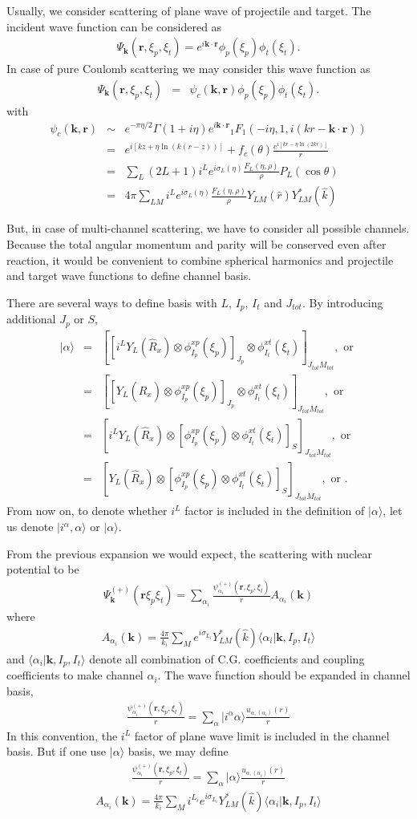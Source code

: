 \documentclass[11pt]{book}
\def\bm{\boldsymbol}
\def\vk{{\bm k}}
\def\vr{{\bm r}}
\def\la{\langle}
\def\ra{\rangle}
\newcommand{\bea}{\begin{eqnarray}}
\newcommand{\eea}{\end{eqnarray}}
\newcommand{\no}{\nonumber \\}
\begin{document}
Usually, we consider scattering of plane wave of projectile and target. 
The incident wave function can be considered as
\bea 
\Psi_\vk(\vr, \xi_p,\xi_t) = e^{i\vk\cdot\vr}\phi_p(\xi_p)\phi_t(\xi_t).
\eea 
In case of pure Coulomb scattering we may consider this wave function as
\bea 
\Psi_\vk(\vr, \xi_p,\xi_t) &=& \psi_c(\vk,\vr) \phi_p(\xi_p)\phi_t(\xi_t).
\eea 
with 
\bea 
\psi_c(\vk,\vr)&\sim& e^{-\pi\eta/2}\Gamma(1+i\eta)e^{i\vk\cdot\vr}{}_1F_1(-i\eta,1,i(kr-\vk\cdot\vr))\no 
               &=& e^{i[kz+\eta\ln(k(r-z))]} +f_c(\theta)\frac{e^{i[kr-\eta\ln(2k r)]} }{r} \no 
               &=& \sum_{L} (2L+1) i^L e^{i\sigma_L(\eta)}\frac{F_L(\eta,\rho)}{\rho} P_L(\cos\theta) \no 
               &=& 4\pi \sum_{LM}  i^L e^{i\sigma_L(\eta)}\frac{F_L(\eta,\rho)}{\rho} Y_{LM}(\hat{r})Y_{LM}^*(\hat{k})
\eea 

But, in case of multi-channel scattering, we have to consider all possible channels. 
Because the total angular momentum and parity will be conserved even after reaction, 
it would be convenient to combine spherical harmonics and projectile and target wave functions 
to define channel basis. 

There are several ways to define basis with $L$, $I_p$, $I_t$ and $J_{tot}$. 
By introducing additional $J_p$ or $S$,
\bea 
|\alpha\ra &=& \left[ \left[i^{L} Y_{L}(\hat{R}_x)\otimes \phi^{xp}_{I_p}(\xi_p)\right]_{J_p} 
\otimes \phi^{xt}_{I_t}(\xi_t)\right]_{J_{tot}M_{tot}}, \mbox{ or }\no 
  &=& \left[ \left[ Y_{L}(\hat{R}_x)\otimes \phi^{xp}_{I_p}(\xi_p)\right]_{J_p} 
\otimes \phi^{xt}_{I_t}(\xi_t)\right]_{J_{tot}M_{tot}}, \mbox{ or }\no 
  &=& \left[ i^{L} Y_{L}(\hat{R}_x)\otimes 
                           \left[\phi^{xp}_{I_p}(\xi_p)\otimes \phi^{xt}_{I_t}(\xi_t)\right]_{S}\right]_{J_{tot}M_{tot}}, 
                           \mbox{ or } \no 
 &=& \left[ Y_{L}(\hat{R}_x)\otimes  \left[\phi^{xp}_{I_p}(\xi_p)\otimes \phi^{xt}_{I_t}(\xi_t)\right]_{S}\right]_{J_{tot}M_{tot}}, 
\mbox{ or }.                            
\eea  
From now on, to denote whether $i^L$ factor is included in the definition of $|\alpha\ra$,
let us denote $|i^\alpha,\alpha\ra$ or $|\alpha\ra$. 

From the previous expansion we would expect, the scattering with nuclear potential to be 
\bea 
\Psi_\vk^{(+)}(\vr\xi_p\xi_t)
=\sum_{\alpha_i} \frac{\psi^{(+)}_{\alpha_i}(\vr,\xi_p,\xi_t)}{r} A_{\alpha_i}(\vk)  
\eea 
where 
\bea 
A_{\alpha_i}(\vk) = \frac{4\pi}{k_i} \sum_{M} e^{i\sigma_{L_i}} Y^*_{LM}(\hat{k}) \la \alpha_i|\vk, I_p, I_t\ra 
\eea 
and $\la \alpha_i|\vk, I_p, I_t\ra$ denote all combination of C.G. coefficients and coupling coefficients
to make channel $\alpha_i$. 
The wave function should be expanded in channel basis,
\bea  
\frac{\psi^{(+)}_{\alpha_i}(\vr,\xi_p,\xi_t)}{r}=\sum_{\alpha} |i^\alpha  \alpha\ra \frac{ u_{\alpha,(\alpha_i)}(r)}{r}
\eea 
In this convention, the $i^L$ factor of plane wave limit is included in the channel basis. 
But if one use $|\alpha\ra$ basis, we may define
\bea  
\frac{\psi^{(+)}_{\alpha_i}(\vr,\xi_p,\xi_t)}{r}=\sum_{\alpha} |\alpha\ra \frac{ u_{\alpha,(\alpha_i)}(r)}{r}
\eea 
\bea 
A_{\alpha_i}(\vk) = \frac{4\pi}{k_i} \sum_{M}  i^{L_i} e^{i\sigma_{L_i}} Y^*_{LM}(\hat{k}) \la \alpha_i|\vk, I_p, I_t\ra 
\eea 
\end{document}
